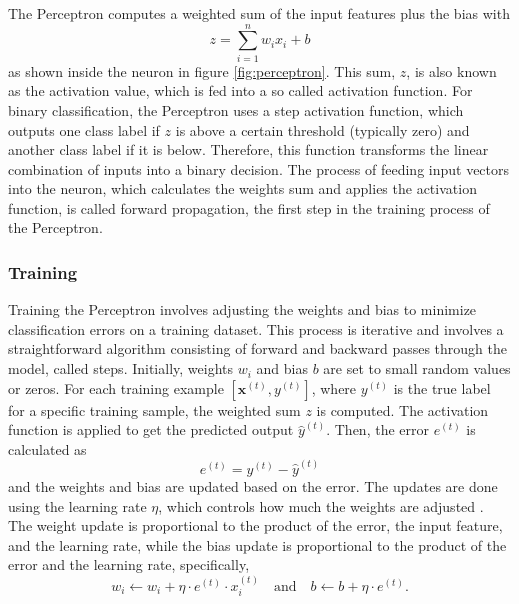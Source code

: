 The Perceptron computes a weighted sum \autocite{Nielsen2015,Szeliski2022} of the input features plus the bias with
\begin{equation}
    z = \sum_{i=1}^n w_i x_i + b
\end{equation}
as shown inside the neuron in figure \ref{fig:perceptron}. This sum, \( z \), is also known as the activation value, which is fed into a so called activation function. For binary classification, the Perceptron uses a step activation function, which outputs one class label if \( z \) is above a certain threshold (typically zero) and another class label if it is below. Therefore, this function transforms the linear combination of inputs into a binary decision. The process of feeding input vectors into the neuron, which calculates the weights sum and applies the activation function, is called forward propagation, the first step in the training process of the Perceptron.

\subsubsection*{Training}
\label{subsec:training_perceptron}

Training the Perceptron involves adjusting the weights and bias to minimize classification errors on a training dataset. This process is iterative and involves a straightforward algorithm consisting of forward and backward passes through the model, called steps. Initially, weights \( w_i \) and bias \( b \) are set to small random values or zeros. For each training example \([\mathbf{x}^{(t)}, y^{(t)}]\), where \( y^{(t)} \) is the true label for a specific training sample, the weighted sum \( z \) is computed. The activation function is applied to get the predicted output \( \hat{y}^{(t)} \). Then, the error \( e^{(t)} \) \autocite{Bishop2006} is calculated as
\begin{equation}
    e^{(t)} = y^{(t)} - \hat{y}^{(t)}
\end{equation}
and the weights and bias are updated based on the error. The updates are done using the learning rate \( \eta \), which controls how much the weights are adjusted  \autocite{Zhang.Lipton.ea2023}. The weight update is proportional to the product of the error, the input feature, and the learning rate, while the bias update is proportional to the product of the error and the learning rate, specifically,
\begin{equation}
    w_i \leftarrow w_i + \eta \cdot e^{(t)} \cdot x_i^{(t)} \quad\text{and}\quad b \leftarrow b + \eta \cdot e^{(t)}.
\end{equation}

